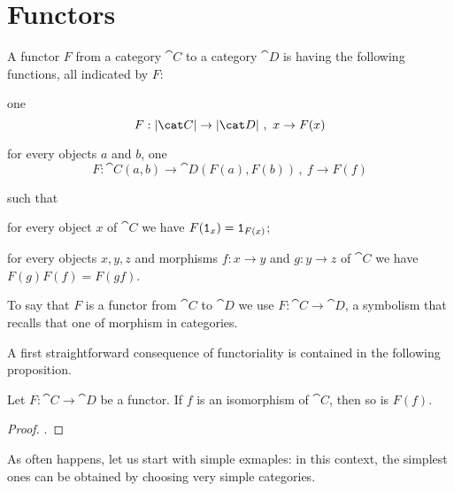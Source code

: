 
\section{Functors}

\begin{definition}[Functors]\label{definition:Functors}
  A functor \(F\) from a category \(\cat C\) to a category \(\cat D\)
  is having the following functions, all indicated by \(F\):
  \begin{tcbitem}
  \item one 
    \[F : \obj{\cat C} \to \obj{\cat D}\,,\ x \to F(x)\]
  \item for every objects \(a\) and \(b\), one 
    \[F : \cat C(a, b) \to \cat D(F(a), F(b))\,,\ f \to F(f)\]
  \end{tcbitem}
  such that
  \begin{tcbenum}
  \item for every object \(x\) of \(\cat C\) we have
    \(F(\mathtt 1_x) = \mathtt 1_{F(x)}\);
  \item for every objects \(x, y, z\) and morphisms \(f : x \to y\) and
    \(g : y \to z\) of \(\cat C\) we have \(F(g) F(f) = F(gf)\).
  \end{tcbenum}
  To say that \(F\) is a functor from \(\cat C\) to \(\cat D\) we use
  \(F : \cat C \to \cat D\), a symbolism that recalls that one of
  morphism in categories.
\end{definition}

A first straightforward consequence of functoriality is contained in
the following proposition.

\begin{proposition}
  Let \(F : \cat C \to \cat D\) be a functor. If \(f\) is an isomorphism
  of \(\cat C\), then so is \(F(f)\).
\end{proposition}

\begin{proof}
  .
\end{proof}

As often happens, let us start with simple exmaples: in this context,
the simplest ones can be obtained by choosing very simple categories.

